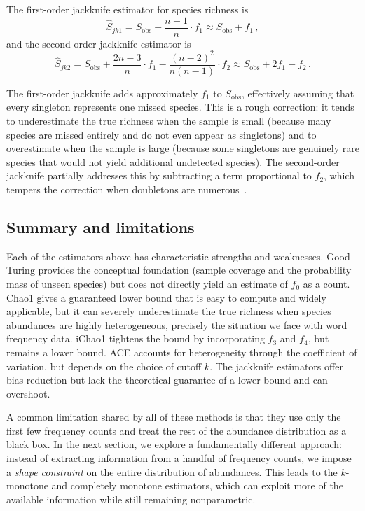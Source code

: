 \documentclass{article}
\begin{document}
{The first-order jackknife estimator for species richness is
\begin{equation}\label{eq:jk1}
    \hat{S}_{jk1} = S_{\mathrm{obs}} + \frac{n-1}{n} \cdot f_1 
    \approx S_{\mathrm{obs}} + f_1\,,
\end{equation}
and the second-order jackknife estimator is
\begin{equation}\label{eq:jk2}
    \hat{S}_{jk2} = S_{\mathrm{obs}} + \frac{2n-3}{n} \cdot f_1 
    - \frac{(n-2)^2}{n(n-1)} \cdot f_2 
    \approx S_{\mathrm{obs}} + 2f_1 - f_2\,.
\end{equation}
 
The first-order jackknife adds approximately $f_1$ to 
$S_{\mathrm{obs}}$, effectively assuming that every singleton represents one missed species. This is a rough correction: it tends to underestimate the true richness when the sample is small (because many species are missed entirely and do not even appear as singletons) and to overestimate when the sample is large (because some singletons are genuinely rare species that would not yield additional undetected species). The second-order jackknife partially addresses this by subtracting a term proportional to $f_2$, which tempers the correction when doubletons are numerous~\cite{burnham1978,burnham1979}.

\subsection{Summary and limitations}
 
Each of the estimators above has characteristic strengths and weaknesses. Good--Turing provides the conceptual foundation (sample coverage and the probability mass of unseen species) but does not directly yield an estimate of $f_0$ as a count. Chao1 gives a guaranteed lower bound that is easy to compute and widely applicable, but it can severely underestimate the true richness when species abundances are highly heterogeneous, precisely the situation we face
with word frequency data. iChao1 tightens the bound by incorporating
$f_3$ and $f_4$, but remains a lower bound. ACE accounts for heterogeneity through the coefficient of variation, but depends on the choice of cutoff $k$. The jackknife estimators offer bias reduction but lack the theoretical guarantee of a lower bound and can overshoot.
 
A common limitation shared by all of these methods is that they use  only the first few frequency counts and treat the rest of the abundance distribution as a black box. In the next section, we explore a fundamentally different approach: instead of extracting information from a handful of frequency counts, we impose a \emph{shape constraint} on the entire distribution of abundances. This leads to the $k$-monotone and completely monotone estimators, which can exploit more of the available information while still remaining nonparametric.

}
\end{document}
